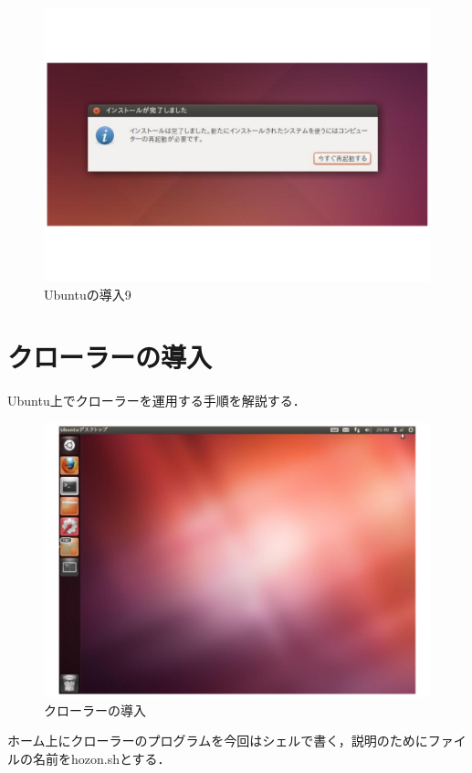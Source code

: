 \begin{figure}[H]
\centering
\includegraphics[width=13cm]{figure15.pdf}
\caption{Ubuntuの導入9}\label{sannp}
\end{figure}

\section{クローラーの導入}
Ubuntu上でクローラーを運用する手順を解説する．
\begin{figure}[h]
\centering
\includegraphics[width=13cm]{figure3.pdf}
\caption{クローラーの導入}\label{sannp}
\end{figure}

ホーム上にクローラーのプログラムを今回はシェルで書く，説明のためにファイルの名前をhozon.shとする．

